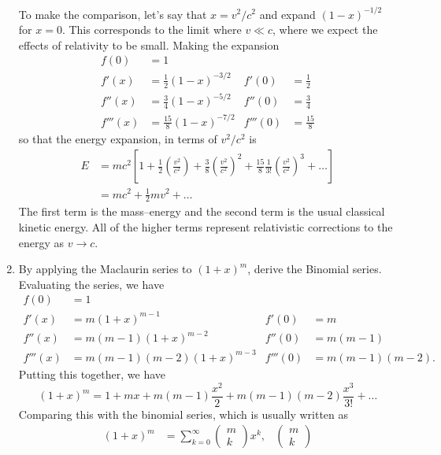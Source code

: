 \documentclass{article}
\begin{document}
\begin{enumerate}
{	To make the comparison, let's say that $x = v^2/c^2$ and expand $(1-x)^{-1/2}$ for $x = 0$.  This corresponds to the limit where $v \ll c$, where we expect the effects of relativity to be small.  Making the expansion 
		\begin{align*}
			f(0) &= 1 \\
			f'(x) &= \frac{1}{2} (1-x)^{-3/2} & f'(0) &= \frac{1}{2} \\
			f''(x) &= \frac{3}{4} (1-x)^{-5/2} & f''(0) &= \frac{3}{4} \\
			f'''(x) &= \frac{15}{8} (1-x)^{-7/2} & f'''(0) &= \frac{15}{8}  
		\end{align*}
		so that the energy expansion, in terms of $v^2/c^2$ is 
		\begin{align*}
			E &= mc^2 \left[ 1 + \frac{1}{2} \left( \frac{v^2}{c^2} \right) + \frac{3}{8} \left( \frac{v^2}{c^2} \right)^2 + \frac{15}{8} \frac{1}{3!} \left( \frac{v^2}{c^2} \right)^3 + \ldots \right] \\
			&= mc^2 + \frac{1}{2} m v^2 + \ldots 
		\end{align*}
		The first term is the mass--energy and the second term is the usual classical kinetic energy.  All of the higher terms represent relativistic corrections to the energy as $v \rightarrow c$.
	}
	\item{By applying the Maclaurin series to $(1+x)^m$, derive the Binomial series. \\
	Evaluating the series, we have 
		\begin{align*}
			f(0) &= 1 \\
			f'(x) &= m (1+x)^{m-1} & f'(0) &= m \\
			f''(x) &= m (m-1) (1+x)^{m-2} & f''(0) &= m (m-1) \\
			f'''(x) &= m (m-1) (m-2) (1+x)^{m-3} & f'''(0) &= m (m-1) (m-2) .
		\end{align*}
		Putting this together, we have 
		\begin{equation*}
			(1+x)^m = 1 + mx + m (m-1) \frac{x^2}{2} + m(m-1)(m-2) \frac{x^3}{3!} + \ldots
		\end{equation*}
		Comparing this with the binomial series, which is usually written as
		\begin{align*}
			(1+x)^m &= \sum_{k=0}^\infty 
			\begin{pmatrix}
				m \\ k
			\end{pmatrix}
			x^k, & \begin{pmatrix}
				m \\ k
			\end{pmatrix} 

\end{align*}}
\end{enumerate}
\end{document}
